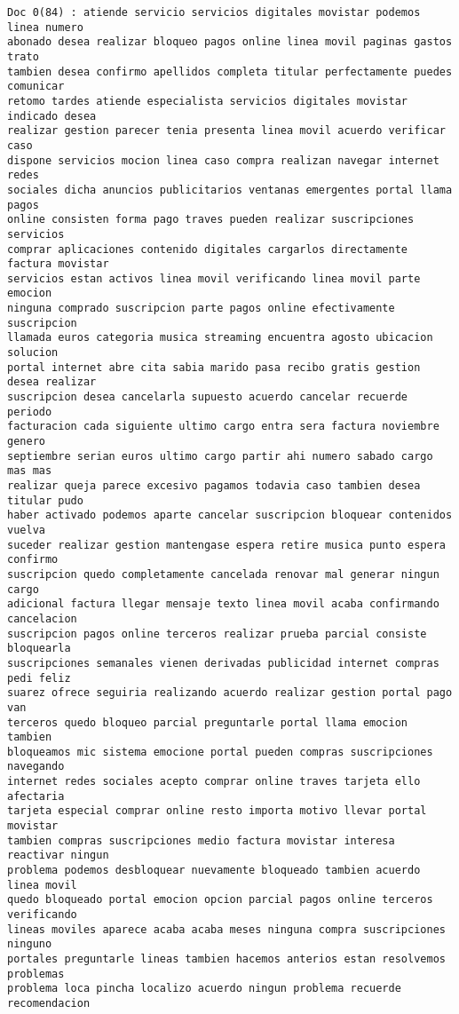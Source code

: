 \begin{Verbatim}[commandchars=\\\{\}]
Doc 0(84) : atiende servicio servicios digitales movistar podemos linea numero
abonado desea realizar bloqueo pagos online linea movil paginas gastos trato
tambien desea confirmo apellidos completa titular perfectamente puedes comunicar
retomo tardes atiende especialista servicios digitales movistar indicado desea
realizar gestion parecer tenia presenta linea movil acuerdo verificar caso
dispone servicios mocion linea caso compra realizan navegar internet redes
sociales dicha anuncios publicitarios ventanas emergentes portal llama pagos
online consisten forma pago traves pueden realizar suscripciones servicios
comprar aplicaciones contenido digitales cargarlos directamente factura movistar
servicios estan activos linea movil verificando linea movil parte emocion
ninguna comprado suscripcion parte pagos online efectivamente suscripcion
llamada euros categoria musica streaming encuentra agosto ubicacion solucion
portal internet abre cita sabia marido pasa recibo gratis gestion desea realizar
suscripcion desea cancelarla supuesto acuerdo cancelar recuerde periodo
facturacion cada siguiente ultimo cargo entra sera factura noviembre genero
septiembre serian euros ultimo cargo partir ahi numero sabado cargo mas mas
realizar queja parece excesivo pagamos todavia caso tambien desea titular pudo
haber activado podemos aparte cancelar suscripcion bloquear contenidos vuelva
suceder realizar gestion mantengase espera retire musica punto espera confirmo
suscripcion quedo completamente cancelada renovar mal generar ningun cargo
adicional factura llegar mensaje texto linea movil acaba confirmando cancelacion
suscripcion pagos online terceros realizar prueba parcial consiste bloquearla
suscripciones semanales vienen derivadas publicidad internet compras pedi feliz
suarez ofrece seguiria realizando acuerdo realizar gestion portal pago van
terceros quedo bloqueo parcial preguntarle portal llama emocion tambien
bloqueamos mic sistema emocione portal pueden compras suscripciones navegando
internet redes sociales acepto comprar online traves tarjeta ello afectaria
tarjeta especial comprar online resto importa motivo llevar portal movistar
tambien compras suscripciones medio factura movistar interesa reactivar ningun
problema podemos desbloquear nuevamente bloqueado tambien acuerdo linea movil
quedo bloqueado portal emocion opcion parcial pagos online terceros verificando
lineas moviles aparece acaba acaba meses ninguna compra suscripciones ninguno
portales preguntarle lineas tambien hacemos anterios estan resolvemos problemas
problema loca pincha localizo acuerdo ningun problema recuerde recomendacion

\end{Verbatim}
